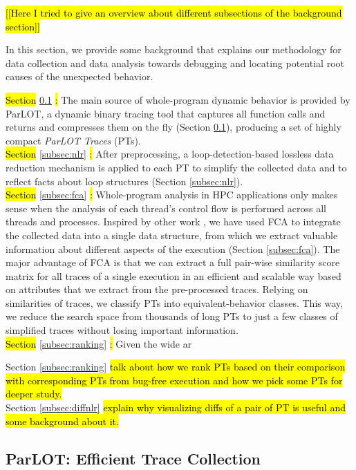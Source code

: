 
\hl{[[Here I tried to give an overview about different subsections of the background section]]}

In this section, we provide some background that explains our methodology for data collection and data analysis towards debugging and locating potential root causes of the unexpected behavior.
%

\hl{Section} \ref{subsec:parlot} \hl{:}
The main source of whole-program dynamic behavior is provided by ParLOT, a dynamic binary tracing tool that captures all function calls and returns and compresses them on the fly (Section \ref{subsec:parlot}), producing a set of highly compact \textit{ParLOT Traces} (PTs).
\\
%
\hl{Section} \ref{subsec:nlr} \hl{:}
After preprocessing, a loop-detection-based lossless data reduction mechanism is applied to each PT to simplify the collected data and to reflect facts about loop structures (Section \ref{subsec:nlr}).
%
\\
\hl{Section} \ref{subsec:fca} \hl{:}
Whole-program analysis in HPC applications only makes sense when the analysis of each thread's control flow is performed across all threads and processes.
%
Inspired by other work \cite{weberStructural} \cite{Alqadah2011} \cite{Ignatov17} \cite{latticeForDistConst}, we have used FCA \cite{clbook} to integrate the collected data into a single data structure, from which we extract valuable information about different aspects of the execution (Section \ref{subsec:fca}).
%
The major advantage of FCA is that we can extract a full pair-wise similarity score matrix for all traces of a single execution in an efficient and scalable way based on attributes that we extract from the pre-processed traces.
%
Relying on similarities of traces, we classify PTs into equivalent-behavior classes.
%
This way, we reduce the search space from thousands of long PTs to just a few classes of simplified traces without losing important information.
\\
\hl{Section} \ref{subsec:ranking} \hl{:}
Given the wide ar


Section \ref{subsec:ranking} \hl{ talk about how we rank PTs based on their comparison with corresponding PTs from bug-free execution and how we pick some PTs for deeper study.}
\\
Section \ref{subsec:diffnlr}\hl{ explain why visualizing diffs of a pair of PT is useful and some background about it.}




\subsection{ParLOT: Efficient Trace Collection}
\label{subsec:parlot}

